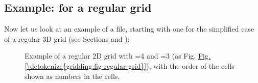 \documentclass[letterpaper,10pt,english]{sphinxmanual}
\begin{document}
\subsection{Example:  for a regular grid}
\label{\detokenize{inputoutputfiles:example-dust-density-inp-for-a-regular-grid}}
Now let us look at an example of a  file,
starting with one for the simplified case of a regular 3\sphinxhyphen{}D grid (see
Sections {\hyperref[\detokenize{inputoutputfiles:sec-amr-grid-regular}]{}} and {\hyperref[\detokenize{gridding:sec-regular-grid}]{}}):

\begin{sphinxVerbatim}[commandchars=\\\{\}]
                                      
\PYG{p}{[}\PYG{p}{]}
\PYG{p}{[}\PYG{p}{]}
\PYG{p}{[}\PYG{p}{]}
\PYG{p}{[}\PYG{p}{]}
\PYG{p}{[}\PYG{p}{]}
\PYG{p}{[}\PYG{p}{]}
\PYG{p}{[}\PYG{p}{]}
\end{sphinxVerbatim}

\begin{figure}[htbp]
\centering
\capstart

\noindent{}
\caption{Example of a regular 2\sphinxhyphen{}D grid with =4 and =3 (as
Fig. \hyperref[\detokenize{gridding:fig-regular-grid}]{Fig.\@ \ref{\detokenize{gridding:fig-regular-grid}}}), with the order of the cells shown as
numbers in the cells.}\label{\detokenize{inputoutputfiles:id1}}\label{\detokenize{inputoutputfiles:fig-regular-grid-numbered}}\end{figure}
\end{document}

